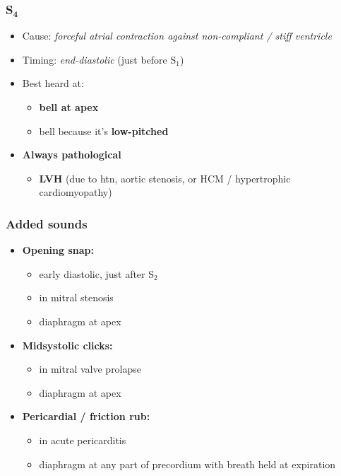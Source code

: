 \documentclass[
  12pt,
]{memoir}
\providecommand{\tightlist}{%
  \setlength{\itemsep}{0pt}\setlength{\parskip}{0pt}}
\begin{document}
\hypertarget{s_textbf4}{%
\subsubsection{\texorpdfstring{S\(_{\textbf{4}}\)}{S\_\{\textbackslash textbf\{4\}\}}}\label{s_textbf4}}

\begin{itemize}
\tightlist
\item
  Cause: \emph{forceful atrial contraction against non-compliant / stiff
  ventricle}
\item
  Timing: \emph{end-diastolic} (just before S\(_1\))
\item
  Best heard at:

  \begin{itemize}
  \tightlist
  \item
    \textbf{bell at apex}
  \item
    bell because it's \textbf{low-pitched}
  \end{itemize}
\item
  \textbf{Always pathological}

  \begin{itemize}
  \tightlist
  \item
    \textbf{LVH} (due to htn, aortic stenosis, or HCM / hypertrophic
    cardiomyopathy)
  \end{itemize}
\end{itemize}

\hypertarget{added-sounds}{%
\subsubsection{Added sounds}\label{added-sounds}}

\begin{itemize}
\tightlist
\item
  \textbf{Opening snap:}

  \begin{itemize}
  \tightlist
  \item
    early diastolic, just after S\(_2\)
  \item
    in mitral stenosis
  \item
    diaphragm at apex
  \end{itemize}
\item
  \textbf{Midsystolic clicks:}

  \begin{itemize}
  \tightlist
  \item
    in mitral valve prolapse
  \item
    diaphragm at apex
  \end{itemize}
\item
  \textbf{Pericardial / friction rub:}

  \begin{itemize}
  \tightlist
  \item
    in acute pericarditis
  \item
    diaphragm at any part of precordium with breath held at expiration
  \end{itemize}
\end{itemize}
\end{document}
